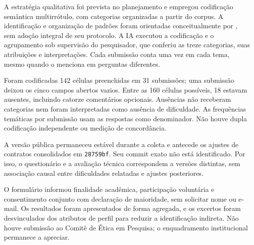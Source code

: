 A estratégia qualitativa foi prevista no planejamento e empregou codificação semântica multirrótulo, com categorias organizadas a partir do corpus. A identificação e organização de padrões foram orientadas conceitualmente por \citet{BRAUN2006}, sem adoção integral de seu protocolo. A IA executou a codificação e o agrupamento sob supervisão do pesquisador, que conferiu as treze categorias, suas atribuições e interpretações. Cada submissão conta uma vez em cada tema, mesmo quando o menciona em perguntas diferentes.

Foram codificadas 142 células preenchidas em 31 submissões; uma submissão deixou os cinco campos abertos vazios. Entre as 160 células possíveis, 18 estavam ausentes, incluindo catorze comentários opcionais. Ausências não receberam categorias nem foram interpretadas como ausência de dificuldade. As frequências temáticas por submissão usam as \UsuariosN{} respostas como denominador. Não houve dupla codificação independente ou medição de concordância.

A versão pública permaneceu estável durante a coleta e antecede os ajustes de contratos consolidados em \texttt{28759bf}. Seu commit exato não está identificado. Por isso, o questionário e a avaliação técnica correspondem a versões distintas, sem associação causal entre dificuldades relatadas e ajustes posteriores.

O formulário informou finalidade acadêmica, participação voluntária e consentimento conjunto com declaração de maioridade, sem solicitar nome ou e-mail. Os resultados foram apresentados de forma agregada, e os excertos foram desvinculados dos atributos de perfil para reduzir a identificação indireta. Não houve submissão ao Comitê de Ética em Pesquisa; o enquadramento institucional permanece a apreciar.
